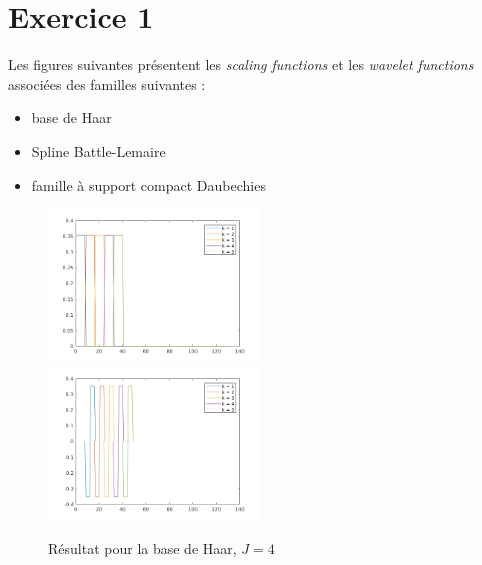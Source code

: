 \documentclass[a4paper,12pt, openany]{book}
\theoremstyle{break}
\begin{document}



\pagestyle{fancy}


\tableofcontents

\clearpage

\listoffigures

\clearpage

\section{Exercice 1}
Les figures suivantes présentent les \textit{scaling functions} et les \textit{wavelet functions} associées des familles suivantes :

\begin{itemize}
  \item base de Haar
  \item Spline Battle-Lemaire
  \item famille à support compact Daubechies
\end{itemize}

\begin{figure}[H]
  \includegraphics[width=0.5\textwidth]{HaarMultipleScaleFather}\hfill
  \includegraphics[width=0.5\textwidth]{HaarMultipleScaleMother}
  \caption{Résultat pour la base de Haar, $J=4$}
  \label{fig:haar_family}
\end{figure}
\end{document}
